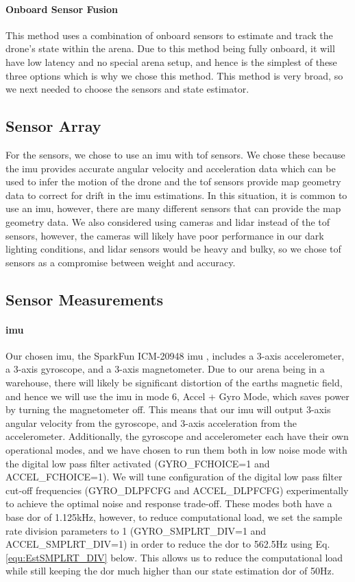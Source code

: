 \documentclass{report_template_oxford}
\begin{document}
\paragraph{Onboard Sensor Fusion} This method uses a combination of onboard sensors to estimate and track the drone's state within the arena. Due to this method being fully onboard, it will have low latency and no special arena setup, and hence is the simplest of these three options which is why we chose this method. This method is very broad, so we next needed to choose the sensors and state estimator.

\subsection{Sensor Array}
For the sensors, we chose to use an \gls{imu} with \gls{tof} sensors. We chose these because the \gls{imu} provides accurate angular velocity and acceleration data which can be used to infer the motion of the drone and the \gls{tof} sensors provide map geometry data to correct for drift in the \gls{imu} estimations. In this situation, it is common to use an \gls{imu}, however, there are many different sensors that can provide the map geometry data. We also considered using cameras and \gls{lidar} instead of the \gls{tof} sensors, however, the cameras will likely have poor performance in our dark lighting conditions, and \gls{lidar} sensors would be heavy and bulky, so we chose \gls{tof} sensors as a compromise between weight and accuracy. 

\subsection{Sensor Measurements}
\paragraph{\gls{imu}} Our chosen \gls{imu}, the SparkFun ICM-20948 \gls{imu} \cite{sparkfun_icm20948}, includes a 3-axis accelerometer, a 3-axis gyroscope, and a 3-axis magnetometer. Due to our arena being in a warehouse, there will likely be significant distortion of the earths magnetic field, and hence we will use the \gls{imu} in mode 6, Accel + Gyro Mode, which saves power by turning the magnetometer off. This means that our \gls{imu} will output 3-axis angular velocity from the gyroscope, and 3-axis acceleration from the accelerometer. Additionally, the gyroscope and accelerometer each have their own operational modes, and we have chosen to run them both in low noise mode with the digital low pass filter activated (GYRO\_FCHOICE=1 and ACCEL\_FCHOICE=1). We will tune configuration of the digital low pass filter cut-off frequencies (GYRO\_DLPFCFG and ACCEL\_DLPFCFG) experimentally to achieve the optimal noise and response trade-off. These modes both have a base \gls{dor} of 1.125kHz, however, to reduce computational load, we set the sample rate division parameters to 1 (GYRO\_SMPLRT\_DIV=1 and ACCEL\_SMPLRT\_DIV=1) in order to reduce the \gls{dor} to 562.5Hz using Eq.\ref{equ:EstSMPLRT_DIV} below. This allows us to reduce the computational load while still keeping the \gls{dor} much higher than our state estimation \gls{dor} of 50Hz. 
\end{document}
